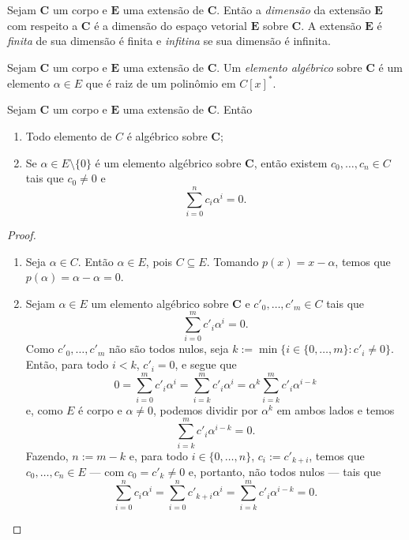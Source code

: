 \begin{definition}
	Sejam $\bm C$ um corpo e $\bm E$ uma extensão de $\bm C$. Então a \emph{dimensão} da extensão $\bm E$ com respeito a $\bm C$ é a dimensão do espaço vetorial $\bm E$ sobre $\bm C$. A extensão $\bm E$ é \emph{finita} de sua dimensão é finita e \emph{infitina} se sua dimensão é infinita.
\end{definition}

\begin{definition}
	Sejam $\bm C$ um corpo e $\bm E$ uma extensão de $\bm C$. Um \emph{elemento algébrico} sobre $\bm C$ é um elemento $\alpha \in E$ que é raiz de um polinômio em $C[x]^*$.
\end{definition}

\begin{proposition}
	Sejam $\bm C$ um corpo e $\bm E$ uma extensão de $\bm C$. Então
	\begin{enumerate}
	\item Todo elemento de $C$ é algébrico sobre $\bm C$;
	\item Se $\alpha \in E \setminus \{0\}$ é um elemento algébrico sobre $\bm C$, então existem $c_0,\ldots,c_n \in C$ tais que $c_0 \neq 0$ e
	\begin{equation*}
	\sum_{i=0}^n c_i\alpha^i = 0.
	\end{equation*}
	\end{enumerate}
\end{proposition}
\begin{proof}
	\begin{enumerate}
	\item Seja $\alpha \in C$. Então $\alpha \in E$, pois $C \subseteq E$. Tomando $p(x)=x-\alpha$, temos que $p(\alpha)=\alpha-\alpha=0$.
	\item Sejam $\alpha \in E$ um elemento algébrico sobre $\bm C$ e $c'_0,\ldots,c'_m \in C$ tais que
	\begin{equation*}
	\sum_{i=0}^m c'_i\alpha^i = 0.
	\end{equation*}
Como $c'_0, \ldots,c'_m$ não são todos nulos, seja $k := \min\{i \in \{0,\ldots,m\} : c'_i \neq 0\}$. Então, para todo $i < k$, $c'_i = 0$, e segue que
	\begin{equation*}
	0 = \sum_{i=0}^m c'_i\alpha^i = \sum_{i=k}^m c'_i\alpha^i = \alpha^k \sum_{i=k}^m c'_i\alpha^{i-k}
	\end{equation*}
e, como $E$ é corpo e $\alpha \neq 0$, podemos dividir por $\alpha^k$ em ambos lados e temos
	\begin{equation*}
	\sum_{i=k}^m c'_i\alpha^{i-k} = 0.
	\end{equation*}
Fazendo, $n := m-k$ e, para todo $i \in \{0,\ldots,n\}$, $c_i := c'_{k+i}$, temos que $c_0,\ldots,c_n \in E$ — com $c_0 = c'_k \neq 0$ e, portanto, não todos nulos — tais que
	\begin{equation*}
	\sum_{i=0}^n c_i\alpha^i = \sum_{i=0}^n c'_{k+i}\alpha^i = \sum_{i=k}^m c'_i\alpha^{i-k} = 0.
	\end{equation*}
	\end{enumerate}
\end{proof}


